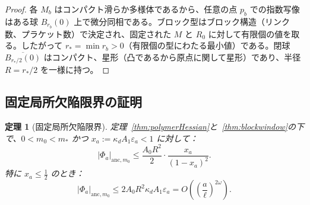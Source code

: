 \documentclass[12pt]{article}
\theoremstyle{plain}
\newtheorem{theorem}{定理}[section]
\theoremstyle{definition}
\numberwithin{equation}{section}
\begin{document}
\begin{proof}
各 $M_b$ はコンパクト滑らか多様体であるから、任意の点 $p_b$ での指数写像はある球 $B_{r_b}(0)$ 上で微分同相である。ブロック型はブロック構造（リンク数、プラケット数）で決定され、固定された $M$ と $R_0$ に対して有限個の値を取る。したがって $r_*=\min r_b>0$（有限個の型にわたる最小値）である。閉球 $\overline{B_{r_*/2}(0)}$ はコンパクト、星形（凸であるから原点に関して星形）であり、半径 $R=r_*/2$ を一様に持つ。
\end{proof}

\subsection{固定局所欠陥限界の証明}

\begin{theorem}[固定局所欠陥限界]\label{thm:LD}
定理~\ref{thm:polymerHessian}と~\ref{thm:blockwindow}の下で、$0<m_0<m_*$ かつ $x_a:=\kappa_d A_1\varepsilon_a<1$ に対して：
\begin{equation}
|\Phi_a|_{\mathrm{anc},m_0} \leq \frac{A_0R^2}{2}\cdot\frac{x_a}{(1-x_a)^2}.
\end{equation}
特に $x_a\leq\frac{1}{2}$ のとき：
\begin{equation}
\boxed{|\Phi_a|_{\mathrm{anc},m_0} \leq 2A_0R^2\kappa_d A_1\varepsilon_a = O\!\left(\left(\frac{a}{\ell}\right)^{2\omega}\right).}
\end{equation}
\end{theorem}
\end{document}
